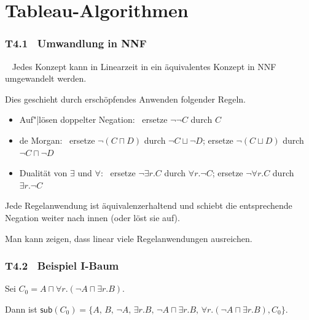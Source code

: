 \documentclass[fontsize=11pt, twoside=false, numbers=autoenddot]{scrbook}
\begin{document}
\part{Tableau-Algorithmen}

\section*{T4.1~ Umwandlung in NNF}

~
Jedes Konzept kann in Linearzeit in ein \"aquivalentes Konzept in NNF
umgewandelt werden.

\par\noindent
\begin{beweis}
  Dies geschieht durch erschöpfendes Anwenden folgender Regeln.
  \begin{itemize}
    \item
      Auf"|lösen doppelter Negation:~
      ersetze $\lnot\lnot C$ durch $C$
    \item
      de Morgan:~
      ersetze $\lnot(C \sqcap D)$ durch $\lnot C \sqcup \lnot D$;
      ersetze $\lnot(C \sqcup D)$ durch $\lnot C \sqcap \lnot D$
    \item
      Dualität von $\exists$ und $\forall$:~
      ersetze $\lnot \exists r.C$ durch $\forall r.\lnot C$;
      ersetze $\lnot \forall r.C$ durch $\exists r.\lnot C$
  \end{itemize}
  Jede Regelanwendung ist äquivalenzerhaltend und schiebt die entsprechende Negation
  weiter nach innen (oder löst sie auf).
  
  Man kann zeigen, dass linear viele Regelanwendungen ausreichen.
  \qedhere
\end{beweis}%

\section*{T4.2~ Beispiel I-Baum}

Sei $C_0 = A \sqcap \forall r.(\lnot A \sqcap \exists r.B)$.

Dann ist $\textsf{sub}(C_0) = \{A,\,B,\,\lnot A,\,\exists r.B,\,\lnot A \sqcap \exists r.B,\,
\forall r.(\lnot A \sqcap \exists r.B), C_0\}$.
\end{document}
